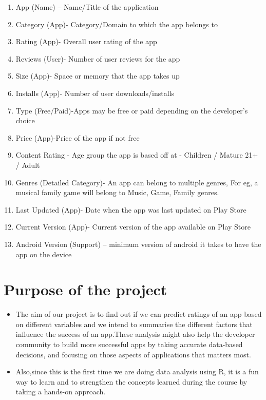 \documentclass[
]{article}
\providecommand{\tightlist}{%
  \setlength{\itemsep}{0pt}\setlength{\parskip}{0pt}}
\begin{document}
\begin{enumerate}
\def\labelenumi{\arabic{enumi})}
\tightlist
\item
  App (Name) -- Name/Title of the application
\item
  Category (App)- Category/Domain to which the app belongs to
\item
  Rating (App)- Overall user rating of the app
\item
  Reviews (User)- Number of user reviews for the app
\item
  Size (App)- Space or memory that the app takes up
\item
  Installs (App)- Number of user downloads/installs
\item
  Type (Free/Paid)-Apps may be free or paid depending on the developer's
  choice
\item
  Price (App)-Price of the app if not free
\item
  Content Rating - Age group the app is based off at - Children / Mature
  21+ / Adult
\item
  Genres (Detailed Category)- An app can belong to multiple genres, For
  eg, a musical family game will belong to Music, Game, Family genres.
\item
  Last Updated (App)- Date when the app was last updated on Play Store
\item
  Current Version (App)- Current version of the app available on Play
  Store\\
\item
  Android Version (Support) -- minimum version of android it takes to
  have the app on the device
\end{enumerate}

\hypertarget{purpose-of-the-project}{%
\section{Purpose of the project}\label{purpose-of-the-project}}

\begin{itemize}
\item
  The aim of our project is to find out if we can predict ratings of an
  app based on different variables and we intend to summarise the
  different factors that influence the success of an app.These analysis
  might also help the developer community to build more successful apps
  by taking accurate data-based decisions, and focusing on those aspects
  of applications that matters most.
\item
  Also,since this is the first time we are doing data analysis using R,
  it is a fun way to learn and to strengthen the concepts learned during
  the course by taking a hands-on approach.
\end{itemize}
\end{document}
